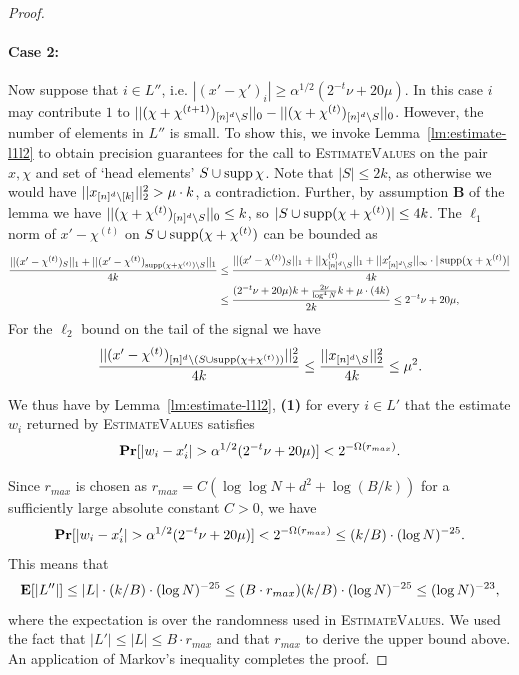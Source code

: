 \begin{proof}
\paragraph{Case 2:}Now suppose that  $i\in L''$, i.e. $|(x'-\chi')_i|\geq \alpha^{1/2}(2^{-t}\nu+20\mu)$. In this case $i$ may contribute $1$ to 
$||(\chi+\chi^{(t+1)})_{{[n]^d}\setminus S}||_0-||(\chi+\chi^{(t)})_{{[n]^d}\setminus S}||_0$. However, 
the number of elements in $L''$ is small. To show this, we invoke Lemma~\ref{lm:estimate-l1l2} to obtain precision guarantees for the call to \textsc{EstimateValues} on the pair $x, \chi$ and set of `head elements' $S\cup \operatorname{supp} \chi$. Note that $|S|\leq 2k$, as otherwise we would have $||x_{{[n]^d}\setminus [k]}||_2^2> \mu\cdot k$, a contradiction. Further, by assumption {\bf B} of the lemma we have $||(\chi+\chi^{(t)})_{{[n]^d}\setminus S}||_0\leq k$, so $|S\cup \operatorname{supp} (\chi+\chi^{(t)})|\leq 4k$. The $\ell_1$ norm of $x'-\chi^{(t)}$ on $S\cup \operatorname{supp} (\chi+\chi^{(t)})$ can be bounded as
\begin{equation*}
\begin{split}
\frac{||(x'-\chi^{(t)})_S||_1+||(x'-\chi^{(t)})_{\text{supp}(\chi+\chi^{(t)})\setminus S}||_1}{4k}&\leq \frac{||(x'-\chi^{(t)})_S||_1+||\chi^{(t)}_{{[n]^d}\setminus S}||_1+||x'_{{[n]^d}\setminus S}||_\infty\cdot |\operatorname{supp} (\chi+\chi^{(t)})|}{4k}\\
&\leq \frac{(2^{-t}\nu+20\mu )k+\frac{2\nu}{\log^4 N} k+\mu\cdot (4k)}{2k}\leq 2^{-t}\nu+20\mu,
\end{split}
\end{equation*}
For the $\ell_2$ bound on the tail of the signal we have 
$$
\frac{||(x'-\chi^{(t)})_{{[n]^d}\setminus (S\cup \operatorname{supp} (\chi+\chi^{(t)}))}||_2^2}{4k}\leq \frac{||x_{{[n]^d}\setminus S}||_2^2}{4k}\leq \mu^2.
$$

We thus have by Lemma~\ref{lm:estimate-l1l2}, {\bf (1)} for every $i\in L'$ that the estimate $w_i$ returned by \textsc{EstimateValues} satisfies
$$
\prob[|w_i-x'_i|>\alpha^{1/2}(2^{-t}\nu+20\mu)]<2^{-\Omega(r_{max})}.
$$

Since $r_{max}$ is chosen as $r_{max}=C(\log\log N+d^2+\log (B/k))$ for a sufficiently large absolute constant $C>0$, we have 
$$
\prob[|w_i-x'_i|>\alpha^{1/2}(2^{-t}\nu+20\mu)]<2^{-\Omega(r_{max})}\leq (k/B)\cdot (\log N)^{-25}.
$$
This means that 
$$
{\bf \mbox{\bf E}}[|L''|]\leq |L|\cdot (k/B)\cdot (\log N)^{-25}\leq (B\cdot r_{max})(k/B)\cdot (\log N)^{-25}\leq (\log N)^{-23},
$$
where the expectation is over the randomness used in \textsc{EstimateValues}. We used the fact that $|L'|\leq |L|\leq B\cdot r_{max}$ and that $r_{max}$ to derive the upper bound above. An application of Markov's inequality completes the proof.
\end{proof}

